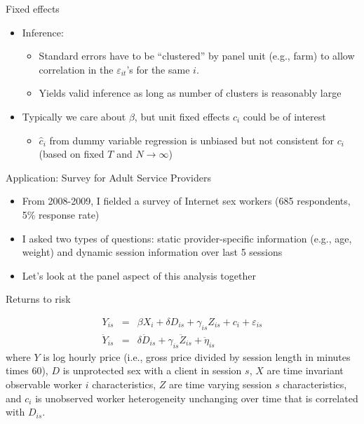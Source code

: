 \documentclass{beamer}
\begin{document}
\begin{frame}{Fixed effects}
	
	\begin{itemize}
	\item Inference:
		\begin{itemize}
		\item Standard errors have to be ``clustered'' by panel unit (e.g., farm) to allow correlation in the $\varepsilon_{it}$'s for the same $i$.
		\item Yields valid inference as long as number of clusters is reasonably large
		\end{itemize}	
	\item Typically we care about $\beta$, but unit fixed effects $c_i$ could be of interest
		\begin{itemize}
		\item $\widehat{c}_i$ from dummy variable regression is unbiased but not consistent for $c_i$ (based on fixed $T$ and $N\rightarrow \infty$)
		\end{itemize}
	\end{itemize}
\end{frame}


\begin{frame}{Application: Survey for Adult Service Providers}

\begin{itemize}
\item From 2008-2009, I fielded a survey of Internet sex workers (685 respondents, 5\% response rate)
\item I asked two types of questions: static provider-specific information (e.g., age, weight) and dynamic session information over last 5 sessions
\item Let's look at the panel aspect of this analysis together
\end{itemize}

\end{frame}

\begin{frame}{Returns to risk}

\begin{eqnarray*}
Y_{is} &=& \beta X_i + \delta{D_{is}} + \gamma_{is} Z_{is} + c_i + \varepsilon_{is} \\
\ddot{Y}_{is} &=&  \delta \ddot{D}_{is} +  \gamma_{is} \ddot{Z}_{is} + \ddot \eta_{is}
\end{eqnarray*}where $Y$ is log hourly price (i.e., gross price divided by session length in minutes times 60), $D$ is unprotected sex with a client in session $s$,  $X$ are time invariant observable worker $i$ characteristics, $Z$ are time varying session $s$ characteristics, and $c_i$ is unobserved worker heterogeneity unchanging over time that is correlated with $D_{is}$.

\end{frame}
\end{document}
